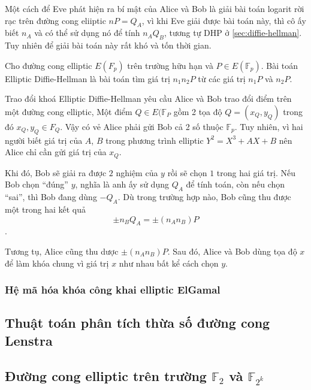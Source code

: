 Một cách để Eve phát hiện ra bí mật của Alice và Bob là giải bài toán logarit
rời rạc trên đường cong eliiptic $ nP = Q_A $, vì khi Eve giải được bài toán này,
thì cô ấy biết $ n_A $ và có thể sử dụng nó để tính $ n_AQ_B $, tương tự DHP ở \ref{sec:diffie-hellman}. Tuy nhiên để giải bài toán này
rất khó và tốn thời gian.


\begin{definition}
	Cho đường cong elliptic $E(F_p)$ trên trường hữu hạn và $P \in
		E(\mathbb{F}_p) $. Bài toán Elliptic Diffie-Hellman là bài toán tìm giá trị $ n_1n_2P $
	từ các giá trị $ n_1P $ và $ n_2P $.
\end{definition}


\begin{remark}
	Trao đổi khoá Elliptic Diffie-Hellman yêu cầu Alice và Bob trao
	đổi điểm trên một đường cong elliptic, Một điểm $Q \in E(\mathbb{F}_P$ gồm 2 tọa độ  $Q = (x_Q, y_Q) $
	trong đó $ x_Q, y_Q \in F_Q$. Vậy có vẻ Alice phải gửi Bob cả 2 số thuộc $\mathbb{F}_p$. Tuy nhiên, vì hai người biết giá trị của $A$, $B$ trong phương
	trình elliptic $Y^2 = X^3 + AX + B$ nên Alice chỉ cần gửi giá trị của $x_Q$.

	Khi đó, Bob sẽ giải ra được $2$ nghiệm của $y$ rồi sẽ chọn $1$ trong hai giá
	trị. Nếu Bob chọn ``đúng'' $y$, nghĩa là anh ấy sử dụng $Q_A$ để tính toán, còn nếu chọn ``sai'',
	thì Bob đang dùng $-Q_A$. Dù trong trường hợp nào, Bob cũng thu được
	một trong hai kết quả
	$$ \pm n_BQ_A = \pm (n_An_B)P$$.

	Tương tụ, Alice cũng thu dược $\pm (n_An_B)P$. Sau đó, Alice và Bob dùng tọa độ $x$ để làm khóa chung vì giá trị $x$ như nhau bất kể cách chọn $y$.


\end{remark}



\subsubsection{Hệ mã hóa khóa công khai elliptic ElGamal}

\subsection{Thuật toán phân tích thừa số đường cong Lenstra}

\subsection{Đường cong elliptic trên trường $\mathbb{F}_2$ và $\mathbb{F}_{2^k}$}